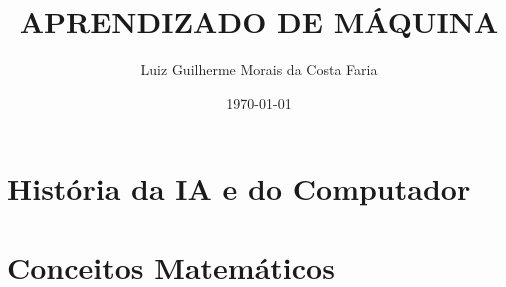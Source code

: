 \documentclass[
    12pt,            %
    a4paper,         %
    book,            %
    openright,       %
    twoside,         %
    brazil           %
]{abntex2}
\title{APRENDIZADO DE MÁQUINA}
\author{Luiz Guilherme Morais da Costa Faria}
\date{\today} %
\begin{document}
\frontmatter

\imprimircapa
\imprimirfolhaderosto


\tableofcontents


\mainmatter

\part{História da IA e do Computador}




\part{Conceitos Matemáticos}
\end{document}
